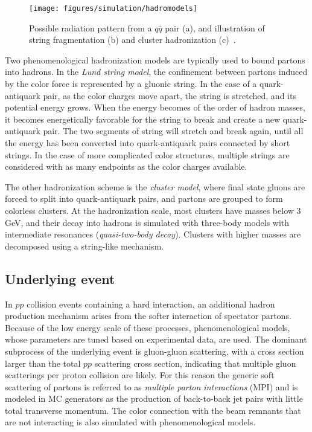 \begin{figure}[ht]
  \begin{center}
    \texttt{[image: figures/simulation/hadromodels]}
    \caption[Hadronization models]{
      Possible radiation pattern from a $q\bar{q}$ pair (a), and
      illustration of string fragmentation (b) and cluster
      hadronization (c)~\cite{mangano2005}.}
    \label{fig:hadronization}
  \end{center}
\end{figure}


Two phenomenological hadronization models are typically used to bound
partons into hadrons.
In the {\it Lund string model}, the confinement between partons
induced by the color force is represented by a gluonic string. In the
case of a quark-antiquark pair, as the color charges move apart, the
string is stretched, and its potential energy grows. When the energy
becomes of the order of hadron masses, it becomes energetically
favorable for the string to break and create a new quark-antiquark
pair. The two segments of string will stretch and break again, until
all the energy has been converted into quark-antiquark pairs connected
by short strings. In the case of more complicated color structures,
multiple strings are considered with as many endpoints as the color
charges available.

The other hadronization scheme is the {\it cluster model}, where
final state gluons are forced to split into quark-antiquark pairs,
and partons are grouped to form colorless clusters.
At the hadronization scale, most clusters have masses below $3$ GeV, and
their decay into hadrons is simulated with three-body models with
intermediate resonances ({\it quasi-two-body decay}). 
Clusters with higher masses are decomposed using a string-like
mechanism.

\subsection{Underlying event}
\label{sec:underlyingevent}

In $pp$ collision events containing a hard interaction, an additional
hadron production mechanism arises from the softer interaction of
spectator partons. Because of the low energy scale of these processes,
phenomenological models, whose parameters are tuned based on
experimental data, are used. 
The dominant subprocess of the underlying event is gluon-gluon
scattering, with a cross section larger than the total $pp$ scattering
cross section, indicating that multiple gluon scatterings per proton
collision are likely. 
For this reason the generic soft scattering of partons is referred to
as {\it multiple parton interactions} (MPI) and is modeled in MC
generators as the production of back-to-back jet pairs with little
total transverse momentum. 
The color connection with the beam remnants that are not
interacting is also simulated with phenomenological models.

